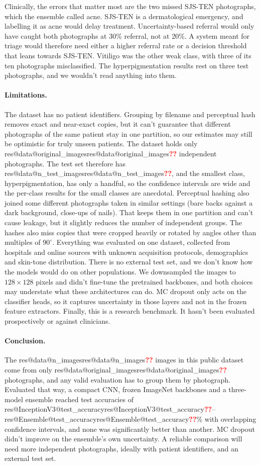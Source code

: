 \documentclass[11pt]{article}
\makeatletter
\newcommand{\res}[2]{\ifcsname res@#1@#2\endcsname\csname res@#1@#2\endcsname\else\textcolor{red}{\textbf{??}}\fi}
\makeatother
\begin{document}
Clinically, the errors that matter most are the two missed SJS-TEN photographs, which the ensemble called acne. SJS-TEN is a dermatological emergency, and labelling it as acne would delay treatment. Uncertainty-based referral would only have caught both photographs at 30\% referral, not at 20\%. A system meant for triage would therefore need either a higher referral rate or a decision threshold that leans towards SJS-TEN. Vitiligo was the other weak class, with three of its ten photographs misclassified. The hyperpigmentation results rest on three test photographs, and we wouldn't read anything into them.

\paragraph{Limitations.} The dataset has no patient identifiers. Grouping by filename and perceptual hash removes exact and near-exact copies, but it can't guarantee that different photographs of the same patient stay in one partition, so our estimates may still be optimistic for truly unseen patients. The dataset holds only \res{data}{original_images} independent photographs. The test set therefore has \res{data}{n_test_images}, and the smallest class, hyperpigmentation, has only a handful, so the confidence intervals are wide and the per-class results for the small classes are anecdotal. Perceptual hashing also joined some different photographs taken in similar settings (bare backs against a dark background, close-ups of nails). That keeps them in one partition and can't cause leakage, but it slightly reduces the number of independent groups. The hashes also miss copies that were cropped heavily or rotated by angles other than multiples of $90^\circ$. Everything was evaluated on one dataset, collected from hospitals and online sources with unknown acquisition protocols, demographics and skin-tone distribution. There is no external test set, and we don't know how the models would do on other populations\cite{daneshjou2022}. We downsampled the images to $128\times128$ pixels and didn't fine-tune the pretrained backbones, and both choices may understate what these architectures can do. MC dropout only acts on the classifier heads, so it captures uncertainty in those layers and not in the frozen feature extractors. Finally, this is a research benchmark. It hasn't been evaluated prospectively or against clinicians.

\paragraph{Conclusion.} The \res{data}{n_images} images in this public dataset come from only \res{data}{original_images} photographs, and any valid evaluation has to group them by photograph. Evaluated that way, a compact CNN, frozen ImageNet backbones and a three-model ensemble reached test accuracies of \res{InceptionV3}{test_accuracy}--\res{Ensemble}{test_accuracy}\% with overlapping confidence intervals, and none was significantly better than another. MC dropout didn't improve on the ensemble's own uncertainty. A reliable comparison will need more independent photographs, ideally with patient identifiers, and an external test set.
\end{document}
